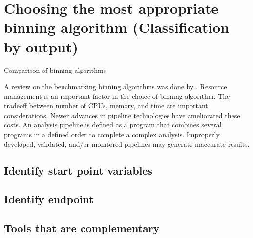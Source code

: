 \documentclass{article}
\begin{document}
\section{Choosing the most appropriate binning algorithm (Classification by output)}
\begin{table}
\begin{tiny}
\centering
\caption[Comparison of binning algorithms]{Comparison of binning algorithms}
	
\label{Tbinningsoftware}
\end{tiny}
\end{table}

A review on the benchmarking binning algorithms was done by .
Resource management is an important factor in the choice of binning algorithm.
The tradeoff between number of \glspl{CPU}, memory, and time are important considerations.
Newer advances in pipeline technologies have ameliorated these costs.
An analysis pipeline is defined as a program that combines several programs in a defined order to complete a complex analysis.
Improperly developed, validated, and/or monitored pipelines may generate inaccurate results.
\subsection{Identify start point variables} 

\subsection{Identify endpoint}
\subsection{Tools that are complementary} 
\end{document}
